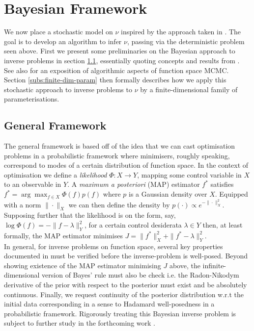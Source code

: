 \documentclass[runningheads]{llncs}
\begin{document}
\section{Bayesian Framework}\label{sec:bayesian}

We now place a stochastic model on $\nu$ inspired by the approach taken in
\cite{cotter2013bayesian}. The goal is to develop an algorithm to infer $\nu$,
passing via the deterministic problem seen above.  First we present some
preliminaries on the Bayesian approach to inverse problems in section
\ref{subs:gf}, essentially quoting concepts and results from
\cite{dashti2017bayesian}. See also \cite{cotter2013mcmc} for an exposition of
algorithmic aspects of function space MCMC. Section \ref{subs:finite-dim-param}
then formally describes how we apply this stochastic approach to inverse
problems to $\nu$ by a finite-dimensional family of parameterisations.

\subsection{General Framework}\label{subs:gf}

The general framework is based off of the idea that we can cast optimisation
problems in a probabilistic framework where minimisers, roughly speaking,
correspond to modes of a certain distribution of function space.  In the context
of optimisation we define a \emph{likelihood} $\Phi : X\rightarrow Y$, mapping
some control variable in $X$ to an observable in $Y$.  A \emph{maximum a
posteriori} (MAP) estimator $f^*$ satisfies $f^* = \arg\max_{f\in X} \Phi(f)
p(f)$ where $p$ is a Gaussian density over $X$. Equipped with a norm
$\|\cdot\|_X$ we can then define the density by $p(\cdot) \propto
e^{-\|\cdot\|_X^2}$.  Supposing further that the likelihood is on the form, say,
$\log \Phi(f) = -\|f-\lambda\|_Y^2$, for a certain control desiderata $\lambda\in Y$
then, at least formally, the MAP estimator minimises $J =\|f^*\|_X^2 +
\|f^*-\lambda\|_Y^2$.\\

In general, for inverse problems on function space, several key properties
documented in \cite{?} must be verified before the inverse-problem is
well-posed. Beyond showing existence of the MAP estimator minimising $J$ above,
the infinite-dimensional version of Bayes' rule must also be check i.e. the
Radon-Nikodym derivative of the prior with respect to the posterior must exist
and be absolutely continuous. Finally, we request continuity of the posterior
distribution w.r.t the initial data corresponding in a sense to Hadamard
well-posedness in a probabilistic framework. Rigorously treating this Bayesian
inverse problem is subject to further study in the forthcoming work
\cite{bockarnaudoncotter2019}.
\end{document}
